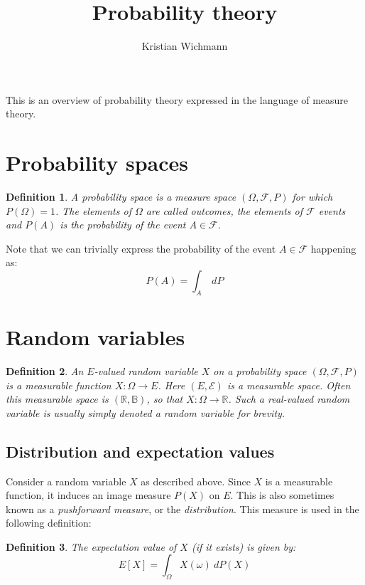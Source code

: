\documentclass[12pt, a4paper]{article}
\title{Probability theory}
\author{Kristian Wichmann}
\newtheorem{definition}{Definition}[section]
\begin{document}
\maketitle

This is an overview of probability theory expressed in the language of measure theory.

\section{Probability spaces}
\begin{definition}
A probability space is a measure space $(\Omega, \mathcal{F}, P)$ for which $P(\Omega)=1$. The elements of $\Omega$ are called outcomes, the elements of $\mathcal{F}$ events and $P(A)$ is the probability of the event $A\in\mathcal{F}$.
\end{definition}

Note that we can trivially express the probability of the event $A\in\mathcal{F}$ happening as:
\begin{equation}
\label{unit_density}
P(A)=\int_A\ dP
\end{equation}

\section{Random variables}
\begin{definition}
An $E$-valued random variable $X$ on a probability space $(\Omega, \mathcal{F}, P)$ is a measurable function $X: \Omega\rightarrow E$. Here $(E,\mathcal{E})$ is a measurable space. Often this measurable space is $(\mathbb{R},\mathbb{B})$, so that $X: \Omega\rightarrow\mathbb{R}$. Such a real-valued random variable is usually simply denoted a random variable for brevity.
\end{definition}

\subsection{Distribution and expectation values}
Consider a random variable $X$ as described above. Since $X$ is a measurable function, it induces an image measure $P(X)$ on $E$. This is also sometimes known as a \textit{pushforward measure}, or the \textit{distribution}. This measure is used in the following definition:
\begin{definition}
The expectation value of $X$ (if it exists) is given by:
\begin{equation}
E[X]=\int_\Omega X(\omega)\ dP(X)
\end{equation}
\end{definition}
\end{document}
